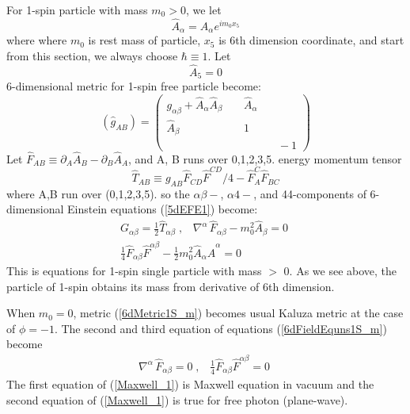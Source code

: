 \documentclass[twocolumn,showpacs,preprintnumbers,amsmath,amssymb]{revtex4}
\begin{document}
For 1-spin particle with mass $m_0 > 0 $, we let 
\begin{equation}
\hat{A}_{\alpha} = A_{\alpha}e^{im_{0} x_5}
\label{hatA}
\end{equation}
where where $m_{0}$ is rest mass of particle, $x_5$ is 6th dimension coordinate, 
and start from this section, we always choose $\hbar \equiv  1$.
Let 
\begin{equation}
\hat{A}_{5} = 0
\label{hatA_5}
\end{equation}
6-dimensional metric for 1-spin free particle become:
\begin{equation}
\left( \hat{g}_{AB} \right) = \left( \begin{array}{cc}
   g_{\alpha\beta} + \hat{A}_{\alpha} \hat{A}_{\beta} \; \; & \; \; 
       \hat{A}_{\alpha} \; \\
    \hat{A}_{\beta} \; \;                                & \; \; 
     1 \; \; \; \; \; \; \\
  \; \; \; \; \; \; \; \; \;  & \; \; \; \; \; \; \; \; \; \; \;  \; \;   -1  \end{array} \right) 
\label{6dMetric1S_m}
\end{equation}
Let $\hat{F}_{AB} \equiv \partial_{A} \hat{A}_{B} - 
\partial_{B} \hat{A}_{A}$, and A, B runs over 0,1,2,3,5. 
energy momentum tensor
\begin{equation}
\hat{T}_{AB} \equiv g_{AB} \hat{F}_{CD} \hat{F}^{CD}/4 - \hat{F}_{A}^{C} \hat{F}_{BC}
\label{1SpinT}
\end{equation}
where A,B run over (0,1,2,3,5).
so the $\alpha \beta-$, $\alpha 4- $, and 44-components of 
6-dimensional Einstein equations (\ref{5dEFE1}) become:
\begin{eqnarray}
G_{\alpha\beta} = \frac{1}{2} 
   \hat{T}_{\alpha\beta} \; , \; \; \; 
\nabla^{\alpha} \, \hat{F}_{\alpha\beta} - m_0^{2} \hat{A}_{\beta} = 0 \; \nonumber \\
\frac{1}{4}\hat{F}_{\alpha\beta} \hat{F}^{\alpha\beta} - \frac{1}{2} m_{0}^{2} \hat{A}_{\alpha} \hat{A}^{\alpha} = 0 \; \; \; 
\label{6dFieldEquns1S_m}
\end{eqnarray}
This is equations for 1-spin single particle with mass $>$ 0. 
As we see above, the particle of 1-spin obtains its mass from derivative of 6th dimension.

When $m_0 = 0$, metric (\ref{6dMetric1S_m}) becomes usual Kaluza metric at the case of $\phi = -1$. The second and 
third equation of equations (\ref{6dFieldEquns1S_m}) become
\begin{eqnarray}
\nabla^{\alpha} \, \hat{F}_{\alpha\beta} = 0 \;, \; \; \;
\frac{1}{4}\hat{F}_{\alpha\beta} \hat{F}^{\alpha\beta} = 0 \; 
\label{Maxwell_1}
\end{eqnarray}
The first equation of (\ref{Maxwell_1}) is Maxwell equation in vacuum and the second equation of (\ref{Maxwell_1}) is true 
for free photon (plane-wave).
\end{document}
